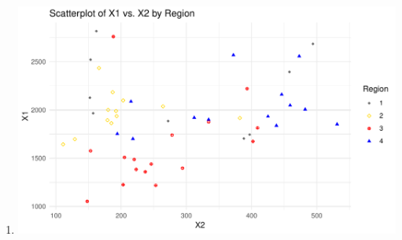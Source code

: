 \documentclass[12pt,letterpaper]{article}
\begin{document}
\begin{itemize}

  \begin{enumerate}
	\item[]
	\includegraphics[width=.85\textwidth]{plot.symbols.colors4_RJ.C.pdf}
  \end{enumerate}


\end{itemize}
\end{document}
